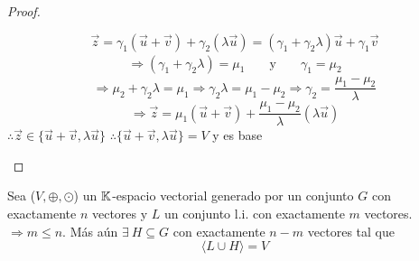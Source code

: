 \begin{proof}
\begin{enumerate}
    \begin{equation*}
        \vec{z} = {\gamma}_{1}(\vec{u} + \vec{v}) + {\gamma}_{2}(\lambda \vec{u}) = ({\gamma}_{1}+{\gamma}_{2}\lambda) \vec{u} + {\gamma}_{1}\vec{v}
    \end{equation*}
    \begin{align*}
        \Rightarrow ({\gamma}_{1}+{\gamma}_{2}\lambda) = {\mu}_{1} && \text{ y } && {\gamma}_{1} = {\mu}_{2}
    \end{align*}
    \begin{equation*}
        \Rightarrow {\mu}_{2}+{\gamma}_{2}\lambda = {\mu}_{1} \Rightarrow {\gamma}_{2}\lambda = {\mu}_{1} - {\mu}_{2} \Rightarrow  {\gamma}_{2} = \frac{{\mu}_{1} - {\mu}_{2}}{\lambda}
    \end{equation*}
    \begin{equation*}
        \Rightarrow \vec{z} = {\mu}_{1}(\vec{u} + \vec{v}) + \frac{{\mu}_{1} - {\mu}_{2}}{\lambda}(\lambda \vec{u})
    \end{equation*}
    $\therefore \vec{z} \in \{ \vec{u} + \vec{v}, \lambda \vec{u} \}$
    $\therefore \{ \vec{u} + \vec{v}, \lambda \vec{u} \} = V$ y es base
\end{enumerate}
\end{proof}



\begin{theorem} \label{reemplazamiento}
    Sea ($V, \oplus, \odot$) un $\mathbb{K}$-espacio vectorial generado por un conjunto $G$ con exactamente $n$ vectores y $L$ un conjunto l.i. con exactamente $m$ vectores. $\Rightarrow m \leqslant n$. Más aún $\exists \: H \subseteq G$ con exactamente $n-m$ vectores tal que
    \begin{equation*}
        \langle L \cup H \rangle = V
    \end{equation*}
\end{theorem}

